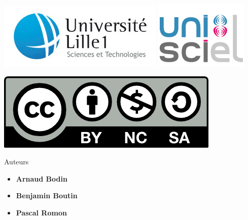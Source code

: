 







\begin{frame}

\thispagestyle{empty}    

  \hspace*{-20ex}
  \begin{minipage}{0.6\textwidth}
  \begin{center}
    \vspace*{5ex}   


    \bigskip

    \includegraphics[scale=0.3]{../divers/logotypeLille1-QUADRI-ECRAN.jpg}
    \quad
    \includegraphics[scale=0.3]{../divers/logo-unisciel.png}

    \vspace*{5ex}

    \includegraphics[scale=0.5]{../divers/by-nc-sa.png}
  \end{center}
  \end{minipage}
  \hfil
  \begin{minipage}{0.45\textwidth}
  \vspace*{5ex}
  Auteurs
  \begin{itemize}
    \item {\bf Arnaud Bodin}
    \item {\bf Benjamin Boutin}
    \item {\bf Pascal Romon}
  \end{itemize}


\end{minipage}
\end{frame}
